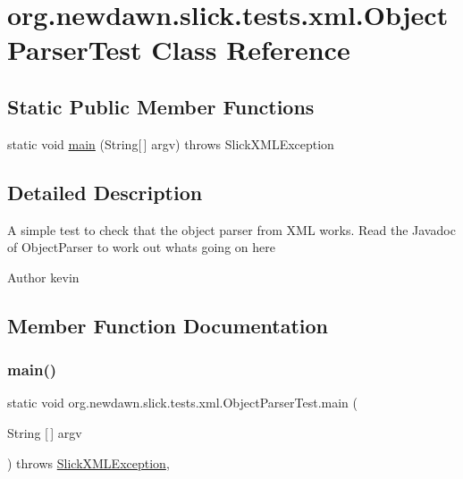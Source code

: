 \hypertarget{classorg_1_1newdawn_1_1slick_1_1tests_1_1xml_1_1_object_parser_test}{}\section{org.\+newdawn.\+slick.\+tests.\+xml.\+Object\+Parser\+Test Class Reference}
\label{classorg_1_1newdawn_1_1slick_1_1tests_1_1xml_1_1_object_parser_test}
\subsection*{Static Public Member Functions}
\begin{DoxyCompactItemize}
\item 
static void \mbox{\hyperlink{classorg_1_1newdawn_1_1slick_1_1tests_1_1xml_1_1_object_parser_test_a9a32ce53ed96a12e394a3b84c92030b9}{main}} (String\mbox{[}$\,$\mbox{]} argv)  throws Slick\+X\+M\+L\+Exception 
\end{DoxyCompactItemize}


\subsection{Detailed Description}
A simple test to check that the object parser from X\+ML works. Read the Javadoc of Object\+Parser to work out whats going on here

\begin{DoxyAuthor}{Author}
kevin 
\end{DoxyAuthor}


\subsection{Member Function Documentation}
\mbox{\label{classorg_1_1newdawn_1_1slick_1_1tests_1_1xml_1_1_object_parser_test_a9a32ce53ed96a12e394a3b84c92030b9}} 
\subsubsection{\texorpdfstring{main()}{main()}}
{\footnotesize\ttfamily static void org.\+newdawn.\+slick.\+tests.\+xml.\+Object\+Parser\+Test.\+main (\begin{DoxyParamCaption}\item[{String \mbox{[}$\,$\mbox{]}}]{argv }\end{DoxyParamCaption}) throws \mbox{\hyperlink{classorg_1_1newdawn_1_1slick_1_1util_1_1xml_1_1_slick_x_m_l_exception}{Slick\+X\+M\+L\+Exception}}\hspace{0.3cm}{\ttfamily [inline]}, {\ttfamily [static]}}

